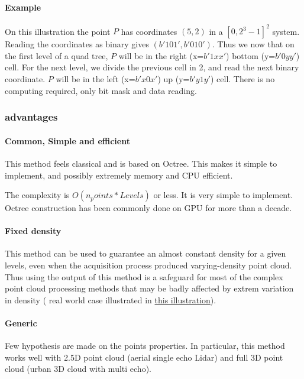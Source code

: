 			\paragraph{Example} 
				 On this illustration the point $P$ has coordinates $(5,2)$ in a $[0,2^3-1]^2$ system. Reading the coordinates as binary gives $(b'101',b'010')$.
				 Thus we now that on the first level of a quad tree, $P$ will be in the right (x=$b'1xx'$) bottom (y=$b'0yy'$) cell.
				 For the next level, we divide the previous cell in 2, and read the next binary coordinate. $P$ will be in the left (x=$b'x0x'$) up (y=$b'y1y'$) cell. There is no computing required, only bit mask and data reading.
			
		\subsubsection{advantages}	
			\paragraph{Common, Simple and efficient}
				This method feels classical and is based on Octree. This makes it simple to implement, and possibly extremely memory and CPU efficient.

				The complexity is $O(n_points*Levels)$ or less. It is very simple to implement.				
				Octree construction has been commonly done on GPU for more than a decade.
				
			\paragraph{Fixed density}
				This method can be used to guarantee an almost constant density for a given levels, even when the acquisition process produced varying-density point cloud.
				Thus using the output of this method is a safeguard for most of the complex point cloud processing methods that may be badly affected by extrem variation in density ( real world case illustrated in \href{fig:density-variation}{this illustration}).
			\paragraph{Generic}
				Few hypothesis are made on the points properties. In particular, this method works well with 2.5D point cloud (aerial single echo Lidar) and full 3D point cloud (urban 3D cloud with multi echo).
